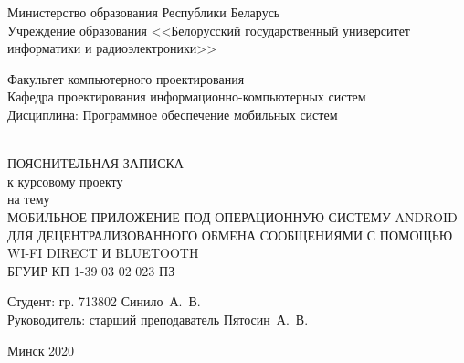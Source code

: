 \begin{titlepage}
  \begin{center}
    Министерство образования Республики Беларусь\\[0.4em]
    Учреждение образования <<Белорусский государственный университет информатики и радиоэлектроники>>\\[3.5em]

    \begin{minipage}{\textwidth}
      \begin{flushleft}
          Факультет компьютерного проектирования\\[1em]

          Кафедра проектирования информационно-компьютерных систем\\[1em]

          Дисциплина: Программное обеспечение мобильных систем
      \end{flushleft}
    \end{minipage}\\[3em]

    {ПОЯСНИТЕЛЬНАЯ ЗАПИСКА}\\
    {к курсовому проекту}\\
    {на тему}\\[1em]
    \MakeTextUppercase{Мобильное приложение под операционную систему Android для децентрализованного обмена сообщениями с помощью Wi-Fi Direct и Bluetooth}\\[1em]


    {БГУИР КП 1-39 03 02 023 ПЗ}

    \vspace{8em}

    \begin{flushright}
        \begin{minipage}{9.3cm}
            Студент:  гр. 713802 Синило~А.~В.\\[1.4em]

            Руководитель: старший преподаватель Пятосин~А.~В.
        \end{minipage}
    \end{flushright}

    \vfill
    {\normalsize Минск 2020}
  \end{center}
\end{titlepage}
